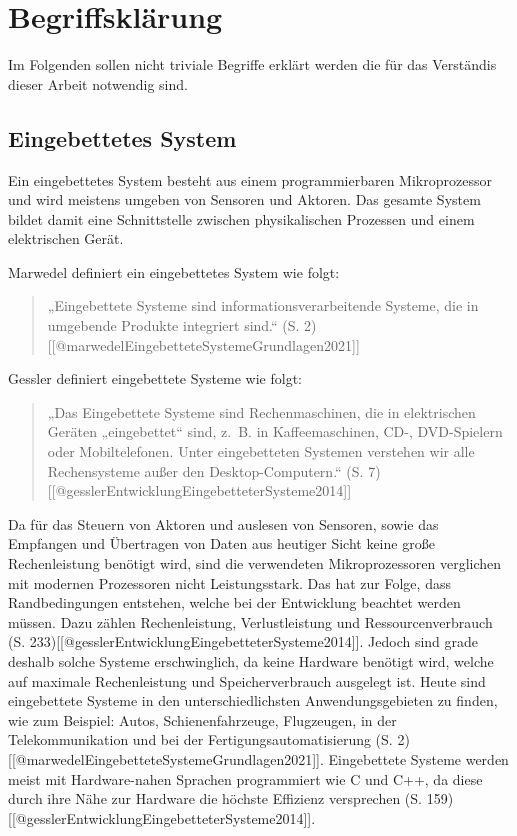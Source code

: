 \chapter{Begriffsklärung}
Im Folgenden sollen nicht triviale Begriffe erklärt werden die für das Verständis dieser Arbeit notwendig sind.

\section{Eingebettetes System}
Ein eingebettetes System besteht aus einem programmierbaren Mikroprozessor und wird meistens umgeben von Sensoren und Aktoren. Das gesamte System bildet damit eine Schnittstelle zwischen physikalischen Prozessen und einem elektrischen Gerät.

Marwedel definiert ein eingebettetes System wie folgt:
\begin{quote}
    „Eingebettete Systeme sind informationsverarbeitende Systeme, die in umgebende Produkte integriert sind.“
    (S. 2) [[@marwedelEingebetteteSystemeGrundlagen2021]]
\end{quote}

Gessler definiert eingebettete Systeme wie folgt:
\begin{quote}
    „Das Eingebettete Systeme sind Rechenmaschinen, die in elektrischen Geräten „eingebettet“ sind, z. B. in Kaffeemaschinen, CD-, DVD-Spielern oder Mobiltelefonen. Unter eingebetteten Systemen verstehen wir alle Rechensysteme außer den Desktop-Computern.“
    (S. 7) [[@gesslerEntwicklungEingebetteterSysteme2014]]
\end{quote}

Da für das Steuern von Aktoren und auslesen von Sensoren, sowie das Empfangen und Übertragen von Daten aus heutiger Sicht keine große Rechenleistung benötigt wird, sind die verwendeten Mikroprozessoren verglichen mit modernen Prozessoren nicht Leistungsstark. Das hat zur Folge, dass Randbedingungen entstehen, welche bei der Entwicklung beachtet werden müssen. Dazu zählen Rechenleistung, Verlustleistung und Ressourcenverbrauch (S. 233)[[@gesslerEntwicklungEingebetteterSysteme2014]]. Jedoch sind grade deshalb solche Systeme erschwinglich, da keine Hardware benötigt wird, welche auf maximale Rechenleistung und Speicherverbrauch ausgelegt ist. Heute sind eingebettete Systeme in den unterschiedlichsten Anwendungsgebieten zu finden, wie zum Beispiel: Autos, Schienenfahrzeuge, Flugzeugen, in der Telekommunikation und bei der Fertigungsautomatisierung (S. 2)[[@marwedelEingebetteteSystemeGrundlagen2021]]. Eingebettete Systeme werden meist mit Hardware-nahen Sprachen programmiert wie C und C++, da diese durch ihre Nähe zur Hardware die höchste Effizienz versprechen (S. 159)[[@gesslerEntwicklungEingebetteterSysteme2014]].

